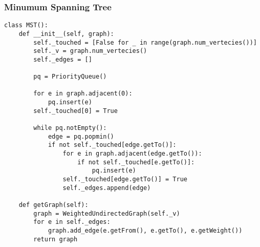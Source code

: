 \documentclass[12pt]{article}
\begin{document}
\subsubsection{Minumum Spanning Tree}
\begin{lstlisting}
class MST():
	def __init__(self, graph):
		self._touched = [False for _ in range(graph.num_vertecies())]
		self._v = graph.num_vertecies()
		self._edges = []

		pq = PriorityQueue()

		for e in graph.adjacent(0):
			pq.insert(e)
		self._touched[0] = True

		while pq.notEmpty():
			edge = pq.popmin()
			if not self._touched[edge.getTo()]:
				for e in graph.adjacent(edge.getTo()):
					if not self._touched[e.getTo()]:
						pq.insert(e)
				self._touched[edge.getTo()] = True
				self._edges.append(edge)

	def getGraph(self):
		graph = WeightedUndirectedGraph(self._v)
		for e in self._edges:
			graph.add_edge(e.getFrom(), e.getTo(), e.getWeight())
		return graph
\end{lstlisting}
\end{document}
